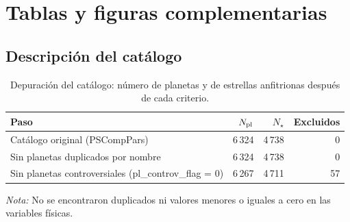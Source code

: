 \providecommand{\rutafiguras}{figuras}

\chapter{Tablas y figuras complementarias}
\label{anx:complementarias}

\section{Descripción del catálogo}
\label{anx:catalogo}

\begin{table}[htbp]
    \centering
    \caption{Depuración del catálogo: número de planetas y de estrellas anfitrionas después de cada criterio.}
    \label{tab:D-T1}
    \small
    \begin{tabular}{p{}rrr}
    \toprule
    Paso & $N_{\rm pl}$ & $N_\star$ & Excluidos \\
    \midrule
    Catálogo original (PSCompPars) & 6\,324 & 4\,738 & 0 \\
    Sin planetas duplicados por nombre & 6\,324 & 4\,738 & 0 \\
    Sin planetas controversiales (pl\_controv\_flag = 0) & 6\,267 & 4\,711 & 57 \\
    \bottomrule
    \end{tabular}
    \par\smallskip
    {\footnotesize\textit{Nota:} No se encontraron duplicados ni valores menores o iguales a cero en las variables físicas.}
\end{table}

